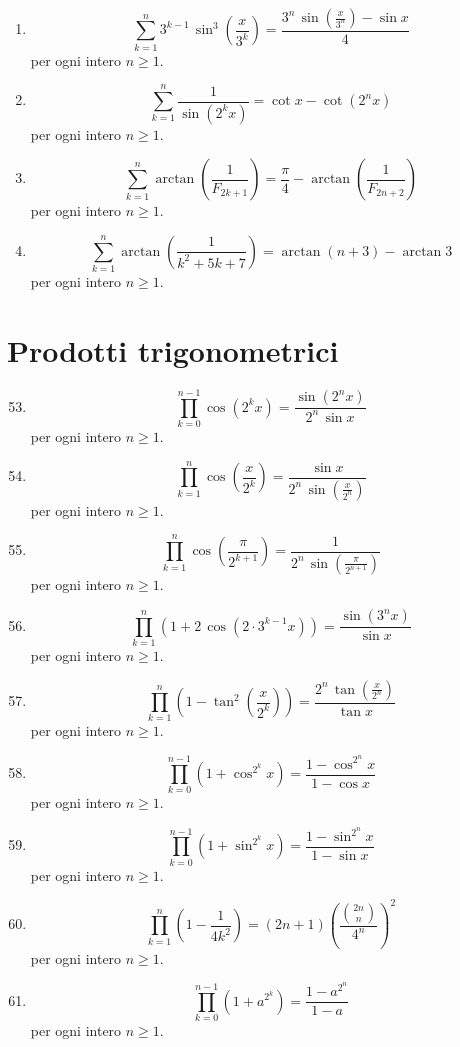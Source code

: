 \documentclass[11pt,a4paper]{article}
\begin{document}
\begin{enumerate}
{\small per ogni intero $n\ge 1$.}
\item \[ \sum_{k=1}^{n} 3^{k - 1}\,\sin^{3}\left(\frac{x}{3^{k}}\right) = \frac{3^{n}\,\sin\left(\frac{x}{3^{n}}\right) - \sin x}{4} \]
{\small per ogni intero $n\ge 1$.}
\item \[ \sum_{k=1}^{n} \frac{1}{\sin\left(2^{k}x\right)} = \cot x - \cot\left(2^{n}x\right) \]
{\small per ogni intero $n\ge 1$.}
\item \[ \sum_{k=1}^{n} \arctan\left(\frac{1}{F_{2k + 1}}\right) = \frac{\pi}{4} - \arctan\left(\frac{1}{F_{2n + 2}}\right) \]
{\small per ogni intero $n\ge 1$.}
\item \[ \sum_{k=1}^{n} \arctan\left(\frac{1}{k^{2} + 5k + 7}\right) = \arctan\left(n + 3\right) - \arctan 3 \]
{\small per ogni intero $n\ge 1$.}
\end{enumerate}

\section*{Prodotti trigonometrici}
\begin{enumerate}
\setcounter{enumi}{52}
\item \[ \prod_{k=0}^{n - 1} \cos\left(2^{k}x\right) = \frac{\sin\left(2^{n}x\right)}{2^{n}\,\sin x} \]
{\small per ogni intero $n\ge 1$.}
\item \[ \prod_{k=1}^{n} \cos\left(\frac{x}{2^{k}}\right) = \frac{\sin x}{2^{n}\,\sin\left(\frac{x}{2^{n}}\right)} \]
{\small per ogni intero $n\ge 1$.}
\item \[ \prod_{k=1}^{n} \cos\left(\frac{\pi}{2^{k + 1}}\right) = \frac{1}{2^{n}\,\sin\left(\frac{\pi}{2^{n + 1}}\right)} \]
{\small per ogni intero $n\ge 1$.}
\item \[ \prod_{k=1}^{n} \left(1 + 2\,\cos\left(2 \cdot 3^{k - 1}x\right)\right) = \frac{\sin\left(3^{n}x\right)}{\sin x} \]
{\small per ogni intero $n\ge 1$.}
\item \[ \prod_{k=1}^{n} \left(1 - \tan^{2}\left(\frac{x}{2^{k}}\right)\right) = \frac{2^{n}\,\tan\left(\frac{x}{2^{n}}\right)}{\tan x} \]
{\small per ogni intero $n\ge 1$.}
\item \[ \prod_{k=0}^{n - 1} \left(1 + \cos^{2^{k}} x\right) = \frac{1 - \cos^{2^{n}} x}{1 - \cos x} \]
{\small per ogni intero $n\ge 1$.}
\item \[ \prod_{k=0}^{n - 1} \left(1 + \sin^{2^{k}} x\right) = \frac{1 - \sin^{2^{n}} x}{1 - \sin x} \]
{\small per ogni intero $n\ge 1$.}
\item \[ \prod_{k=1}^{n} \left(1 - \frac{1}{4k^{2}}\right) = \left(2n + 1\right)\left(\frac{\binom{2n}{n}}{4^{n}}\right)^{2} \]
{\small per ogni intero $n\ge 1$.}
\item \[ \prod_{k=0}^{n - 1} \left(1 + a^{2^{k}}\right) = \frac{1 - a^{2^{n}}}{1 - a} \]
{\small per ogni intero $n\ge 1$.}
\end{enumerate}
\end{document}
